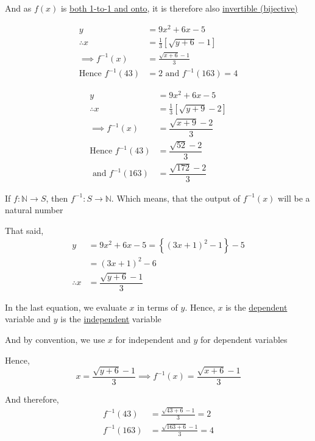 \documentclass[14pt,fleqn]{extarticle}
\newcommand\N{\mathbb{N}}
\newcommand\fx{9x^2+6x-5}
\newcommand\invfx{\frac{\sqrt{x+6} - 1}{3}}
\begin{document}
\begin{problem}
\begin{step}
And as $f(x)$ is \underline{both 1-to-1 and onto}, it is therefore also 
\underline{invertible (bijective)}
\end{step}

\begin{step}
  \begin{options} 
     \correct 
       
       \begin{align}
       y &= \fx \\
       \therefore x &= \frac{1}{3} \left[\sqrt{y + 6} - 1 \right] \\
       \implies f^{-1}(x) &= \invfx \\
       \text{Hence }f^{-1}(43) &= 2\text{ and } f^{-1}(163) = 4 
\end{align}
     \incorrect
     
     \begin{align}
       y &= \fx \\
       \therefore x &= \frac{1}{3} \left[\sqrt{y + 9} - 2 \right] \\
       \implies f^{-1}(x) &= \dfrac{\sqrt{x+9} - 2}{3} \\
       \text{Hence }f^{-1}(43) &= \dfrac{\sqrt{52}-2}{3}\\
       \text{ and } f^{-1}(163) &= \dfrac{\sqrt{172}-2}{3}
\end{align}
        
    \end{options} 
     \reason 
     
     If $f:\N\to S$, then $f^{-1}:S\to\N$. Which means, that the output of $f^{-1}(x)$ will be a natural number \newline 
     
     That said, 
     \begin{align}
     y &= \fx = \left\lbrace (3x+1)^2 - 1\right\rbrace -5 \\
     &= (3x+1)^2 - 6 \\
     \therefore x &= \dfrac{\sqrt{y+6}-1}{3} 
\end{align}

In the last equation, we evaluate $x$ in terms of $y$. Hence, $x$ is the \underline{dependent} variable and $y$ is the \underline{independent} variable\newline 

And by convention, we use $x$ for independent and $y$ for dependent variables\newline 

Hence, 
\[ x = \frac{\sqrt{y+6}-1}{3} \implies f^{-1}(x) = \frac{\sqrt{x+6}-1}{3} \]

And therefore, 
\begin{align}
f^{-1}(43) &= \frac{\sqrt{43+6}-1}{3} = 2 \\
f^{-1}(163) &= \frac{\sqrt{163+6}-1}{3} = 4 
\end{align}
\end{step}
\end{problem} 
\end{document}
